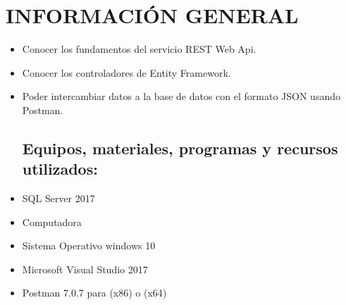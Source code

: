 \section{INFORMACIÓN GENERAL} 

\begin{itemize}
\subsection{Objetivos:}
	\item Conocer los fundamentos del servicio REST Web Api.
	\item Conocer los controladores de Entity Framework.
	\item Poder intercambiar datos a la base de datos con el formato JSON usando Postman.

\subsection{Equipos, materiales, programas y recursos utilizados:}
	\item SQL Server 2017
	\item Computadora
	\item Sistema Operativo windows 10
	\item Microsoft Visual Studio 2017
	\item Postman 7.0.7 para (x86) o (x64)


\end{itemize}